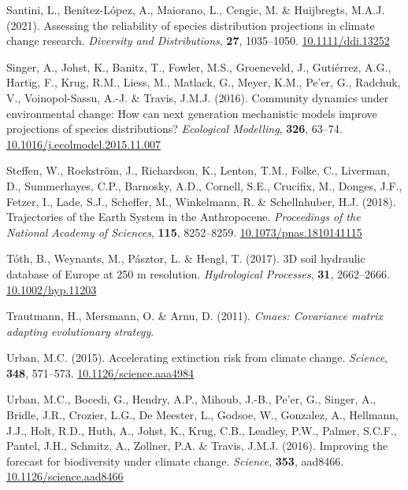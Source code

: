 \documentclass[11pt,]{article}
\newlength{\cslhangindent}
\newenvironment{CSLReferences}[2] %
 {%
  \setlength{\parindent}{0pt}
  \ifodd #1 \everypar{\setlength{\hangindent}{\cslhangindent}}\ignorespaces\fi
  \ifnum #2 > 0
  \setlength{\parskip}{#2\baselineskip}
  \fi
 }%
 {}
\begin{document}
\begin{CSLReferences}{1}{0}
\leavevmode{}%
Santini, L., Benítez-López, A., Maiorano, L., Cengic, M. \& Huijbregts,
M.A.J. (2021). Assessing the reliability of species distribution
projections in climate change research. \emph{Diversity and
Distributions}, \textbf{27}, 1035--1050.
\href{https://doi.org/10.1111/ddi.13252}{10.1111/ddi.13252}

\leavevmode{}%
Singer, A., Johst, K., Banitz, T., Fowler, M.S., Groeneveld, J.,
Gutiérrez, A.G., Hartig, F., Krug, R.M., Liess, M., Matlack, G., Meyer,
K.M., Pe'er, G., Radchuk, V., Voinopol-Sassu, A.-J. \& Travis, J.M.J.
(2016). Community dynamics under environmental change: {How} can next
generation mechanistic models improve projections of species
distributions? \emph{Ecological Modelling}, \textbf{326}, 63--74.
\href{https://doi.org/10.1016/j.ecolmodel.2015.11.007}{10.1016/j.ecolmodel.2015.11.007}

\leavevmode{}%
Steffen, W., Rockström, J., Richardson, K., Lenton, T.M., Folke, C.,
Liverman, D., Summerhayes, C.P., Barnosky, A.D., Cornell, S.E.,
Crucifix, M., Donges, J.F., Fetzer, I., Lade, S.J., Scheffer, M.,
Winkelmann, R. \& Schellnhuber, H.J. (2018). Trajectories of the {Earth}
{System} in the {Anthropocene}. \emph{Proceedings of the National
Academy of Sciences}, \textbf{115}, 8252--8259.
\href{https://doi.org/10.1073/pnas.1810141115}{10.1073/pnas.1810141115}

\leavevmode{}%
Tóth, B., Weynants, M., Pásztor, L. \& Hengl, T. (2017). {3D} soil
hydraulic database of {Europe} at 250 m resolution. \emph{Hydrological
Processes}, \textbf{31}, 2662--2666.
\href{https://doi.org/10.1002/hyp.11203}{10.1002/hyp.11203}

\leavevmode{}%
Trautmann, H., Mersmann, O. \& Arnu, D. (2011). \emph{Cmaes: Covariance
matrix adapting evolutionary strategy}.

\leavevmode{}%
Urban, M.C. (2015). Accelerating extinction risk from climate change.
\emph{Science}, \textbf{348}, 571--573.
\href{https://doi.org/10.1126/science.aaa4984}{10.1126/science.aaa4984}

\leavevmode{}%
Urban, M.C., Bocedi, G., Hendry, A.P., Mihoub, J.-B., Pe'er, G., Singer,
A., Bridle, J.R., Crozier, L.G., De Meester, L., Godsoe, W., Gonzalez,
A., Hellmann, J.J., Holt, R.D., Huth, A., Johst, K., Krug, C.B.,
Leadley, P.W., Palmer, S.C.F., Pantel, J.H., Schmitz, A., Zollner, P.A.
\& Travis, J.M.J. (2016). Improving the forecast for biodiversity under
climate change. \emph{Science}, \textbf{353}, aad8466.
\href{https://doi.org/10.1126/science.aad8466}{10.1126/science.aad8466}


\end{CSLReferences}
\end{document}
